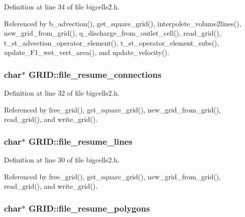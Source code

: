 Definition at line 34 of file bigcells2.\-h.



Referenced by b\-\_\-advection(), get\-\_\-square\-\_\-grid(), interpolete\-\_\-volume2lines(), new\-\_\-grid\-\_\-from\-\_\-grid(), q\-\_\-discharge\-\_\-from\-\_\-outlet\-\_\-cell(), read\-\_\-grid(), t\-\_\-st\-\_\-advection\-\_\-operator\-\_\-element(), t\-\_\-st\-\_\-operator\-\_\-element\-\_\-subs(), update\-\_\-\-F1\-\_\-wet\-\_\-vert\-\_\-area(), and update\-\_\-velocity().

\hypertarget{struct_g_r_i_d_a2b9e00a1b98c6b6761e4d6c7b5e44844}{
\subsubsection[{file\-\_\-resume\-\_\-connections}]{\setlength{\rightskip}{0pt plus 5cm}char$\ast$ G\-R\-I\-D\-::file\-\_\-resume\-\_\-connections}}\label{struct_g_r_i_d_a2b9e00a1b98c6b6761e4d6c7b5e44844}


Definition at line 32 of file bigcells2.\-h.



Referenced by free\-\_\-grid(), get\-\_\-square\-\_\-grid(), new\-\_\-grid\-\_\-from\-\_\-grid(), read\-\_\-grid(), and write\-\_\-grid().

\hypertarget{struct_g_r_i_d_a572c9ae44fb8f35a751c5bd8d70b830f}{
\subsubsection[{file\-\_\-resume\-\_\-lines}]{\setlength{\rightskip}{0pt plus 5cm}char$\ast$ G\-R\-I\-D\-::file\-\_\-resume\-\_\-lines}}\label{struct_g_r_i_d_a572c9ae44fb8f35a751c5bd8d70b830f}


Definition at line 30 of file bigcells2.\-h.



Referenced by free\-\_\-grid(), get\-\_\-square\-\_\-grid(), new\-\_\-grid\-\_\-from\-\_\-grid(), read\-\_\-grid(), and write\-\_\-grid().

\hypertarget{struct_g_r_i_d_a4246eeca1c9ca68c5f7254c36551f6d7}{
\subsubsection[{file\-\_\-resume\-\_\-polygons}]{\setlength{\rightskip}{0pt plus 5cm}char$\ast$ G\-R\-I\-D\-::file\-\_\-resume\-\_\-polygons}}\label{struct_g_r_i_d_a4246eeca1c9ca68c5f7254c36551f6d7}


